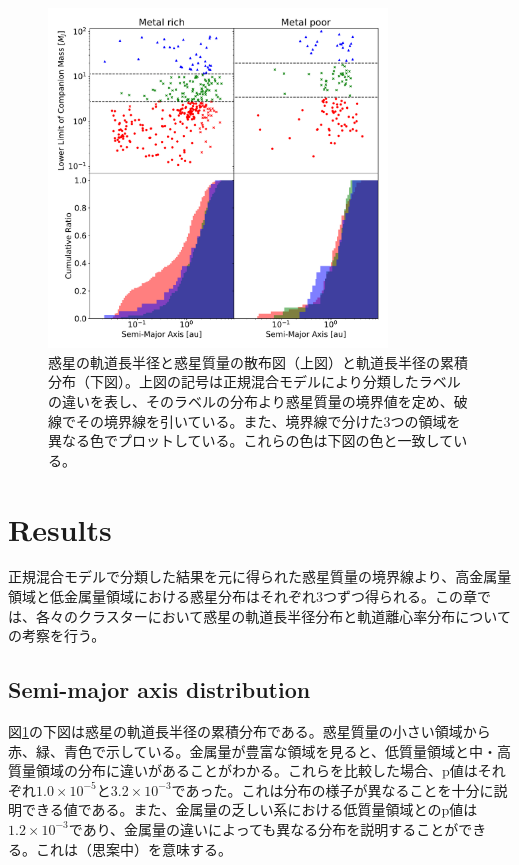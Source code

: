 \documentclass[twocolumn, dvipdfmx]{aastex62}
\begin{document}
\begin{CJK*}{UTF8}{min}
\begin{figure}[t]
\begin{center}
\includegraphics[width=9cm]{../../Figure/a_Mp_merge.pdf}
\caption{惑星の軌道長半径と惑星質量の散布図（上図）と軌道長半径の累積分布（下図）。上図の記号は正規混合モデルにより分類したラベルの違いを表し、そのラベルの分布より惑星質量の境界値を定め、破線でその境界線を引いている。また、境界線で分けた3つの領域を異なる色でプロットしている。これらの色は下図の色と一致している。\label{fig:a_Mp}}
\end{center}
\end{figure}


\section{Results} \label{sec:results}

正規混合モデルで分類した結果を元に得られた惑星質量の境界線より、高金属量領域と低金属量領域における惑星分布はそれぞれ3つずつ得られる。この章では、各々のクラスターにおいて惑星の軌道長半径分布と軌道離心率分布についての考察を行う。


\subsection{Semi-major axis distribution} \label{subsec:axis}

図\ref{fig:a_Mp}の下図は惑星の軌道長半径の累積分布である。惑星質量の小さい領域から赤、緑、青色で示している。金属量が豊富な領域を見ると、低質量領域と中・高質量領域の分布に違いがあることがわかる。これらを比較した場合、p値はそれぞれ$1.0\times10^{-5}$と$3.2\times10^{-3}$であった。これは分布の様子が異なることを十分に説明できる値である。また、金属量の乏しい系における低質量領域とのp値は$1.2\times10^{-3}$であり、金属量の違いによっても異なる分布を説明することができる。これは（思案中）を意味する。



\end{CJK*}
\end{document}
